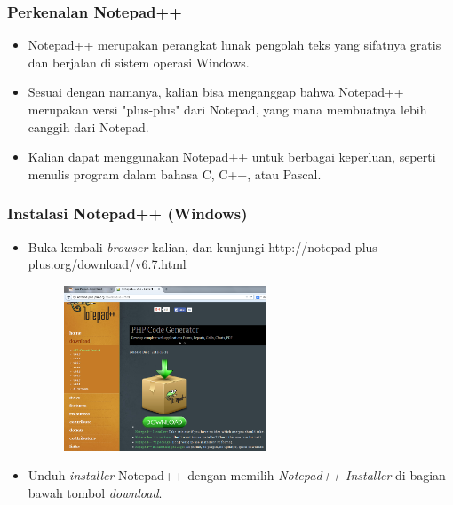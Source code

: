\documentclass{beamer}
\begin{document}
\begin{frame}
\frametitle{Perkenalan Notepad++}
\begin{itemize}
	\item Notepad++ merupakan perangkat lunak pengolah teks yang sifatnya gratis dan berjalan di sistem operasi Windows.
	\item Sesuai dengan namanya, kalian bisa menganggap bahwa Notepad++ merupakan versi "plus-plus" dari Notepad, yang mana membuatnya lebih canggih dari Notepad.
	\item Kalian dapat menggunakan Notepad++ untuk berbagai keperluan, seperti menulis program dalam bahasa C, C++, atau Pascal.
\end{itemize}
\end{frame}

\begin{frame}
\frametitle{Instalasi Notepad++ (Windows)}
\begin{itemize}
	\item Buka kembali \textit{browser} kalian, dan kunjungi http://notepad-plus-plus.org/download/v6.7.html
	\begin{figure}
		\includegraphics[width=6cm]{asset/npp_1.PNG}
	\end{figure}
	\item Unduh \textit{installer} Notepad++ dengan memilih \textit{Notepad++ Installer} di bagian bawah tombol \textit{download}.
\end{itemize}
\end{frame}
\end{document}
